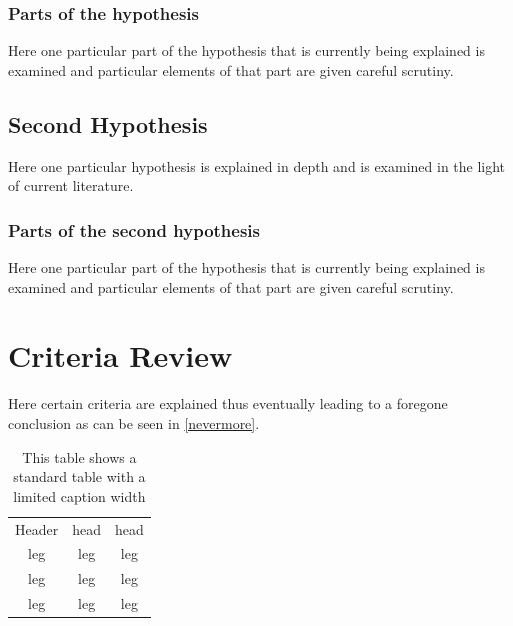 \subsubsection{Parts of the hypothesis}

Here one particular part of the hypothesis that is 
currently being explained is examined and particular
elements of that part are given careful scrutiny.


\subsection{Second Hypothesis}

Here one particular hypothesis is explained in depth
and is examined in the light of current literature.

\subsubsection{Parts of the second hypothesis}

Here one particular part of the hypothesis that is 
currently being explained is examined and particular
elements of that part are given careful scrutiny.

\section{Criteria Review}

Here certain criteria are explained thus eventually
leading to a foregone conclusion as can be seen in
\autoref{nevermore}.
\begin{table}[h!tb] \centering
    \captionsetup{width=2in}
    \caption{This table shows a standard table with a limited caption width}

    \begin{tabular}{c|c|c}
        Header & head  & head\\ 
        leg & leg & leg \\
        leg & leg & leg \\
        leg & leg & leg \\
    \end{tabular}
    \label{nevermore}
    \vspace{ 2 in}
\end{table}

